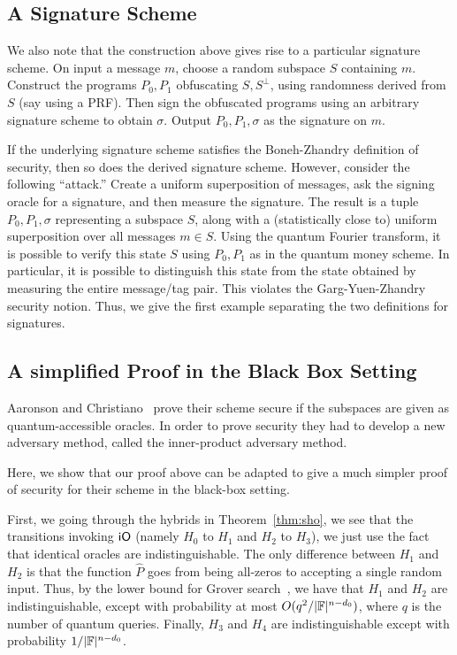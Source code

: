 \subsection{A Signature Scheme}

We also note that the construction above gives rise to a particular signature scheme.  On input a message $m$, choose a random subspace $S$ containing $m$.  Construct the programs $P_0,P_1$ obfuscating $S,S^\bot$, using randomness derived from $S$ (say using a PRF).  Then sign the obfuscated programs using an arbitrary signature scheme to obtain $\sigma$.  Output $P_0,P_1,\sigma$ as the signature on $m$.  

If the underlying signature scheme satisfies the Boneh-Zhandry definition of security, then so does the derived signature scheme.  However, consider the following ``attack.''  Create a uniform superposition of messages, ask the signing oracle for a signature, and then measure the signature.  The result is a tuple $P_0,P_1,\sigma$ representing a subspace $S$, along with a (statistically close to) uniform superposition over all messages $m\in S$.  Using the quantum Fourier transform, it is possible to verify this state $S$ using $P_0,P_1$ as in the quantum money scheme.  In particular, it is possible to distinguish this state from the state obtained by measuring the entire message/tag pair.  This violates the Garg-Yuen-Zhandry security notion.  Thus, we give the first example separating the two definitions for signatures.

\subsection{A simplified Proof in the Black Box Setting}

Aaronson and Christiano~\cite{STOC:AarChr12} prove their scheme secure if the subspaces are given as quantum-accessible oracles.  In order to prove security they had to develop a new adversary method, called the inner-product adversary method.

Here, we show that our proof above can be adapted to give a much simpler proof of security for their scheme in the black-box setting.  

First, we going through the hybrids in Theorem~\ref{thm:sho}, we see that the transitions invoking ${\sf iO}$ (namely $H_0$ to $H_1$ and $H_2$ to $H_3$), we just use the fact that identical oracles are indistinguishable.  The only difference between $H_1$ and $H_2$ is that the function $\hat{P}$  goes from being all-zeros to accepting a single random input.  Thus, by the lower bound for Grover search~\cite{BBBV97}, we have that $H_1$ and $H_2$ are indistinguishable, except with probability at most $O(q^2/|{\mathbb F}|^{n-d_0})$, where $q$ is the number of quantum queries.  Finally, $H_3$ and $H_4$ are indistinguishable except with probability $1/|{\mathbb F}|^{n-d_0}$.

